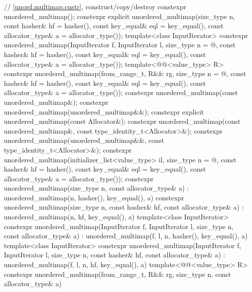 \begin{codeblock}
{{    // \ref{unord.multimap.cnstr}, construct/copy/destroy
    constexpr unordered_multimap();
    constexpr explicit unordered_multimap(size_type n, const hasher& hf = hasher(),
                                          const key_equal& eql = key_equal(),
                                          const allocator_type& a = allocator_type());
    template<class InputIterator>
      constexpr unordered_multimap(InputIterator f, InputIterator l,
                                   size_type n = @\seebelow@, const hasher& hf = hasher(),
                                   const key_equal& eql = key_equal(),
                                   const allocator_type& a = allocator_type());
    template<@@<value_type> R>
      constexpr unordered_multimap(from_range_t, R&& rg,
                                   size_type n = @\seebelow@, const hasher& hf = hasher(),
                                   const key_equal& eql = key_equal(),
                                   const allocator_type& a = allocator_type());
    constexpr unordered_multimap(const unordered_multimap&);
    constexpr unordered_multimap(unordered_multimap&&);
    constexpr explicit unordered_multimap(const Allocator&);
    constexpr unordered_multimap(const unordered_multimap&, const type_identity_t<Allocator>&);
    constexpr unordered_multimap(unordered_multimap&&, const type_identity_t<Allocator>&);
    constexpr unordered_multimap(initializer_list<value_type> il,
                                 size_type n = @\seebelow@, const hasher& hf = hasher(),
                                 const key_equal& eql = key_equal(),
                                 const allocator_type& a = allocator_type());
    constexpr unordered_multimap(size_type n, const allocator_type& a)
      : unordered_multimap(n, hasher(), key_equal(), a) { }
    constexpr unordered_multimap(size_type n, const hasher& hf, const allocator_type& a)
      : unordered_multimap(n, hf, key_equal(), a) { }
    template<class InputIterator>
      constexpr unordered_multimap(InputIterator f, InputIterator l, size_type n,
                                   const allocator_type& a)
        : unordered_multimap(f, l, n, hasher(), key_equal(), a) { }
    template<class InputIterator>
      constexpr unordered_multimap(InputIterator f, InputIterator l, size_type n,
                                   const hasher& hf, const allocator_type& a)
        : unordered_multimap(f, l, n, hf, key_equal(), a) { }
    template<@@<value_type> R>
      constexpr unordered_multimap(from_range_t, R&& rg, size_type n, const allocator_type& a)
}}
\end{codeblock}
